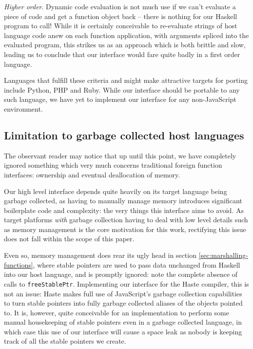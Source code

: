 \documentclass[preprint]{sigplanconf}
\begin{document}
\emph{Higher order}. Dynamic code evaluation is not much use if we can't
evaluate a piece of code and get a function object back -- there is nothing
for our Haskell program to call! While it is certainly conceivable to
re-evaluate strings of host language code anew on each function application,
with arguments spliced into the evaluated program, this strikes us as an
approach which is both brittle and slow, leading us to conclude that our
interface would fare quite badly in a first order language.

Languages that fulfill these criteria and might make attractive targets
for porting include Python, PHP and Ruby. While our interface should be
portable to any such language, we have yet to implement our interface
for any non-JavaScript environment.


\subsection{Limitation to garbage collected host languages}
\label{sec:host-gc}
The observant reader may notice that up until this point, we have completely
ignored something which very much concerns traditional foreign function
interfaces: ownership and eventual deallocation of memory.

Our high level interface depends quite heavily on its target language being
garbage collected, as having to manually manage memory introduces significant
boilerplate code and complexity: the very things this interface aims to avoid.
As target platforms \emph{with} garbage collection having to deal with low
level details such as memory management is the core motivation for this work,
rectifying this issue does not fall within the scope of this paper.

Even so, memory management does rear its ugly head in section
\ref{sec:marshalling-functions}, where stable pointers are used to pass data
unchanged from Haskell into our host language, and is promptly ignored: note
the complete absence of calls to \lstinline!freeStablePtr!. Implementing our
interface for the Haste compiler, this is not an issue: Haste makes full use
of JavaScript's garbage collection capabilities to turn stable pointers into
fully garbage collected aliases of the objects pointed to.
It is, however, quite conceivable for an implementation to perform some manual
housekeeping of stable pointers even in a garbage collected language, in which
case this use of our interface will cause a space leak as nobody is keeping
track of all the stable pointers we create.
\end{document}
